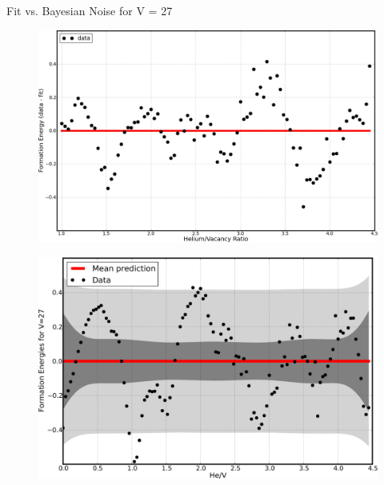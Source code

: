 \documentclass[10pt]{beamer}
\begin{document}
\begin{frame}{Fit vs. Bayesian Noise for V = 27}
	\begin{figure}
		\includegraphics[width=0.5\linewidth]{V27fitnoise}
	\end{figure}
	\vspace{-4mm}
	\begin{figure}
		\includegraphics[width=0.5\linewidth]{V27_bayesian_noise}
	\end{figure}
\end{frame}
\end{document}
